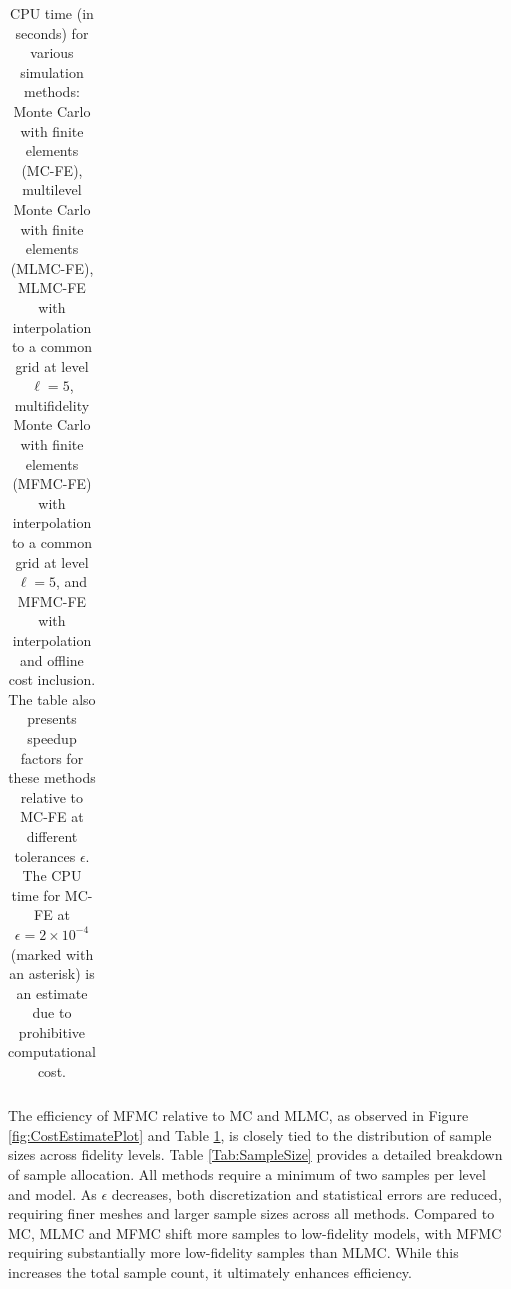\begin{table}[ht]
{\begin{tabular}{c|c|c|c|c|c|c|c|c|c|c|c|c|}
			\hline
	\end{tabular}
 }
	\caption{CPU time (in seconds) for various simulation methods: Monte Carlo with finite elements (MC-FE), multilevel Monte Carlo with finite elements (MLMC-FE), MLMC-FE with interpolation to a common grid at level $\ell=5$, multifidelity Monte Carlo with finite elements (MFMC-FE) with interpolation to a common grid at level $\ell=5$, and MFMC-FE with interpolation and offline cost inclusion. The table also presents speedup factors for these methods relative to MC-FE at different tolerances $\epsilon$. The CPU time for MC-FE at $\epsilon = 2\times 10^{-4}$ (marked with an asterisk) is an estimate due to prohibitive computational cost.}
	\label{Tab:CPU_time}
\end{table}
%







The efficiency of MFMC relative to MC and MLMC, as observed in Figure \ref{fig:CostEstimatePlot} and Table \ref{Tab:CPU_time}, is closely tied to the distribution of sample sizes across fidelity levels. Table \ref{Tab:SampleSize} provides a detailed breakdown of sample allocation. All methods require a minimum of two samples per level and model. As $\epsilon$ decreases, both discretization and statistical errors are reduced, requiring finer meshes and larger sample sizes across all methods. Compared to MC, MLMC and MFMC shift more samples to low-fidelity models, with MFMC requiring substantially more low-fidelity samples than MLMC. While this increases the total sample count, it ultimately enhances efficiency.




